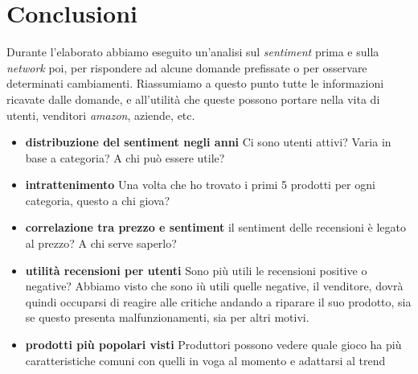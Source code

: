 \chapter{Conclusioni}
	Durante l'elaborato abbiamo eseguito un'analisi sul \textit{sentiment} prima e sulla \textit{network} poi, per rispondere ad alcune domande prefissate o per osservare determinati cambiamenti. Riassumiamo a questo punto tutte le informazioni ricavate dalle domande, e all'utilità che queste possono portare nella vita di utenti, venditori \textit{amazon}, aziende, etc.
	
	\begin{itemize}
		\item \textbf{distribuzione del sentiment negli anni}
		Ci sono utenti attivi? 
		Varia in base a categoria? 
		A chi può essere utile?
		
		\item \textbf{intrattenimento} 
		Una volta che ho trovato i primi 5 prodotti per ogni categoria, questo a chi giova?
		
		\item \textbf{correlazione tra prezzo e sentiment} 
		il sentiment delle recensioni è legato al prezzo? 
		A chi serve saperlo?
		
		\item \textbf{utilità recensioni per utenti}
		Sono più utili le recensioni positive o negative?
		Abbiamo visto che sono iù utili quelle negative, il venditore, dovrà quindi occuparsi di reagire alle critiche andando a riparare il suo prodotto, sia se questo presenta malfunzionamenti, sia per altri motivi.
		
		\item \textbf{prodotti più popolari visti}
		Produttori possono vedere quale gioco ha più caratteristiche comuni con quelli in voga al momento e adattarsi al trend

	\end{itemize}